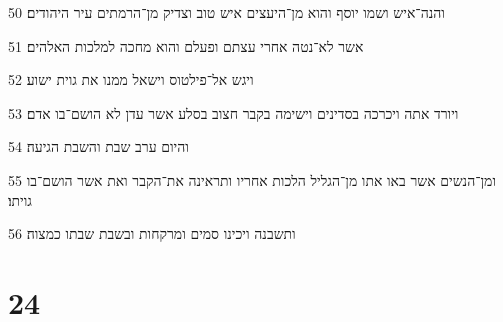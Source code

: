\par 50 והנה־איש ושמו יוסף והוא מן־היעצים איש טוב וצדיק מן־הרמתים עיר היהודים׃
\par 51 אשר לא־נטה אחרי עצתם ופעלם והוא מחכה למלכות האלהים׃
\par 52 ויגש אל־פילטוס וישאל ממנו את גוית ישוע׃
\par 53 ויורד אתה ויכרכה בסדינים וישימה בקבר חצוב בסלע אשר עדן לא הושם־בו אדם׃
\par 54 והיום ערב שבת והשבת הגיעה׃
\par 55 ומן־הנשים אשר באו אתו מן־הגליל הלכות אחריו ותראינה את־הקבר ואת אשר הושם־בו גויתו׃
\par 56 ותשבנה ויכינו סמים ומרקחות ובשבת שבתו כמצוה׃

\chapter{24}

